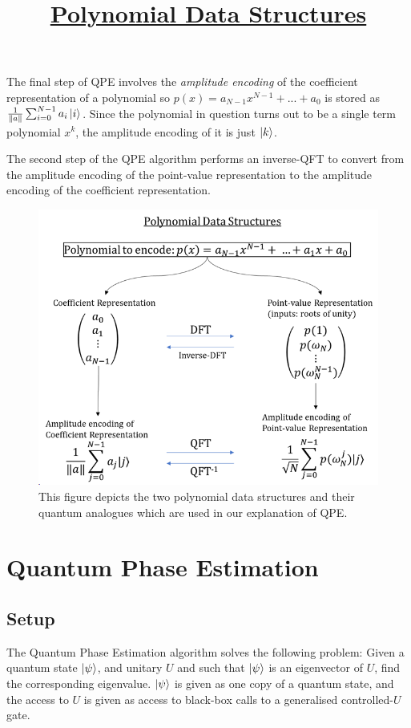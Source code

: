 \documentclass[12pt, a4paper]{article}
\begin{document}
	The final step of QPE involves the \textit{amplitude encoding} of the coefficient representation of a polynomial so $p(x) = a_{N-1}x^{N-1} + ... + a_0$ is stored as $\frac{1}{\norm{a}} \sum_{i=0}^{N-1} a_i \ket{i}$. Since the polynomial in question turns out to be a single term polynomial $x^k$, the amplitude encoding of it is just $\ket{k}$. 
	
	The second step of the QPE algorithm performs an inverse-QFT to convert from the amplitude encoding of the point-value representation to the amplitude encoding of the coefficient representation.
	
		\begin{figure}
		\centering
		\title{\textbf{\underline{Polynomial Data Structures}}}
		
		\vspace{5mm}
		\includegraphics[width=\linewidth]{polyds.png}
		\caption{This figure depicts the two polynomial data structures and their quantum analogues which are used in our explanation of QPE.}
		\label{fig:polyds}
	\end{figure}
	
	\section{Quantum Phase Estimation}
	\label{sec:qpe}
	
	\subsection{Setup}
	The Quantum Phase Estimation algorithm solves the following problem: Given a quantum state $\ket{\psi}$, and unitary $U$ and such that $\ket{\psi}$ is an eigenvector of $U$, find the corresponding eigenvalue. $\ket{\psi}$ is given as one copy of a quantum state, and the access to $U$ is given as access to black-box calls to a generalised controlled-$U$ gate. 
	
\end{document}
